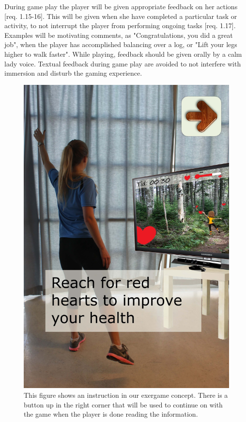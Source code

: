 During game play the player will be given appropriate feedback on her actions [req. 1.15-16]. This will be given when she have completed a particular task or activity, to not interrupt the player from performing ongoing tasks [req. 1.17]. Examples will be motivating comments, as "Congratulations, you did a great job", when the player has accomplished balancing over a log, or "Lift your legs higher to walk faster". While playing, feedback should be given orally by a calm lady voice. Textual feedback during game play are avoided to not interfere with immersion and disturb the gaming experience.  

\begin{figure} [H]
\centering

\includegraphics[scale=0.15]{introKineEng.jpg}
\caption[Instruction]{This figure shows an instruction in our exergame concept. There is a button up in the right corner that will be used to continue on with the game when the player is done reading the information.}
\label{fig:kineintro}
\end{figure}

